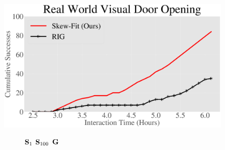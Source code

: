 \begin{figure}[t]
  \centering
  \includegraphics[width=0.7\linewidth]{skewfit/figures/plots/real_world_door.pdf}
    \begin{subfigure}[b]{0.49\textwidth}
        \center
        \hspace{-.2cm}
        ${\mathbf{S}}_1$ \hspace{4.3cm} ${\mathbf{S}}_{100}$ \hspace{.7cm} $\mathbf{G}$


\end{subfigure}
\end{figure}
